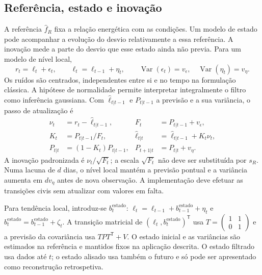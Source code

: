 \subsection{Referência, estado e inovação}
\label{sec:mat-tres-canais}
A referência $\widehat f_R$ fixa a relação energética com as condições. Um modelo de estado pode acompanhar a evolução do desvio relativamente a essa referência. A inovação mede a parte do desvio que esse estado ainda não previa. Para um modelo de nível local,
\begin{equation}
r_t=\ell_t+\epsilon_t,
\qquad \ell_t=\ell_{t-1}+\eta_t,
\qquad \operatorname{Var}(\epsilon_t)=v_\epsilon,\quad\operatorname{Var}(\eta_t)=v_\eta.
\label{eq:mat-nivel-local}
\end{equation}
Os ruídos são centrados, independentes entre si e no tempo na formulação clássica. A hipótese de normalidade permite interpretar integralmente o filtro como inferência gaussiana\parencite{DurbinKoopman2012}. Com $\widehat\ell_{t|t-1}$ e $P_{t|t-1}$ a previsão e a sua variância, o passo de atualização é
\begin{align}
\nu_t&=r_t-\widehat\ell_{t|t-1}, &F_t&=P_{t|t-1}+v_\epsilon,\label{eq:mat-inovacao}\\
K_t&=P_{t|t-1}/F_t, &\widehat\ell_{t|t}&=\widehat\ell_{t|t-1}+K_t\nu_t,\label{eq:mat-kalman}\\
P_{t|t}&=(1-K_t)P_{t|t-1}, &P_{t+1|t}&=P_{t|t}+v_\eta.\label{eq:mat-kalman-variancia}
\end{align}
A inovação padronizada é $\nu_t/\sqrt{F_t}$; a escala $\sqrt{F_t}$ não deve ser substituída por $s_R$. Numa lacuna de $d$ dias, o nível local mantém a previsão pontual e a variância aumenta em $d v_\eta$ antes de nova observação. A implementação deve efetuar as transições civis sem atualizar com valores em falta.

Para tendência local, introduz-se $b_t^{\mathrm{estado}}$: $\ell_t=\ell_{t-1}+b_{t-1}^{\mathrm{estado}}+\eta_t$ e $b_t^{\mathrm{estado}}=b_{t-1}^{\mathrm{estado}}+\zeta_t$. A transição matricial de $(\ell_t,b_t^{\mathrm{estado}})^{\mathsf T}$ usa $T=\left(\begin{smallmatrix}1&1\\0&1\end{smallmatrix}\right)$ e a previsão da covariância usa $TP T^{\mathsf T}+V$. O estado inicial e as variâncias são estimados na referência e mantidos fixos na aplicação descrita. O estado filtrado usa dados até $t$; o estado alisado usa também o futuro e só pode ser apresentado como reconstrução retrospetiva.

